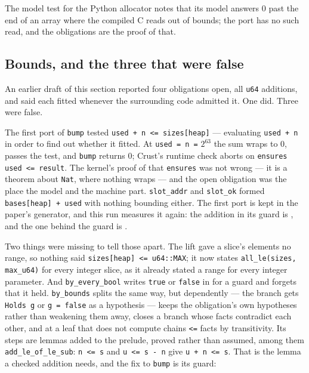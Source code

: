 \documentclass[11pt]{article}
\begin{document}
The model test for the Python allocator notes that its model answers 0
past the end of an array where the compiled C reads out of bounds; the port
has no such read, and the obligations are the proof of that.

\subsection{Bounds, and the three that were false}\label{sec:bounds}

An earlier draft of this section reported four obligations open, all
\texttt{u64} additions, and said each fitted whenever the surrounding code
admitted it.  One did.  Three were false.

The first port of \texttt{bump} tested \texttt{used + n <= sizes[heap]}
--- evaluating \texttt{used + n} in order to find out whether it fitted.
At \texttt{used = n =} $2^{63}$ the sum wraps to 0, passes the test, and
\texttt{bump} returns 0; Crust's runtime check aborts on
\texttt{ensures used <= result}.  The kernel's proof of that
\texttt{ensures} was not wrong --- it is a theorem about \texttt{Nat}, where
nothing wraps --- and the open obligation was the place the model and the
machine part.  \texttt{slot\_addr} and \texttt{slot\_ok} formed
\texttt{bases[heap] + used} with nothing bounding either.  The first port
is kept in the paper's generator, and this run measures it again: the
addition in its guard is \oldGuardAdd{}, and the one behind the guard is
\oldReturnAdd{}.

Two things were missing to tell those apart.  The lift gave a slice's
elements no range, so nothing said \texttt{sizes[heap] <= u64::MAX}; it
now states \texttt{all\_le(sizes, max\_u64)} for every integer slice, as it
already stated a range for every integer parameter.  And
\texttt{by\_every\_bool} writes \texttt{true} or \texttt{false} in for a
guard and forgets that it held.  \texttt{by\_bounds} splits the same way,
but dependently --- the branch gets \texttt{Holds g} or
\texttt{g = false} as a hypothesis --- keeps the obligation's own
hypotheses rather than weakening them away, closes a branch whose facts
contradict each other, and at a leaf that does not compute chains
\texttt{<=} facts by transitivity.  Its steps are \boundsLemmas{} lemmas
added to the prelude, \boundsLemmasAll{} proved rather than assumed, among
them \texttt{add\_le\_of\_le\_sub}: \texttt{n <= s} and
\texttt{u <= s - n} give \texttt{u + n <= s}.  That is the lemma a
checked addition needs, and the fix to \texttt{bump} is its guard:
\end{document}
